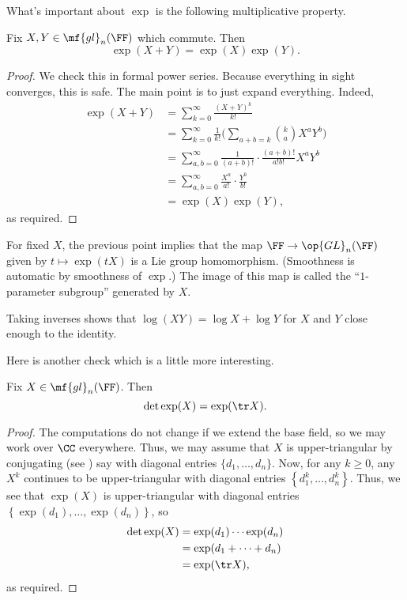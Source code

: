 \documentclass[../notes.tex]{subfiles}
\begin{document}
What's important about $\exp$ is the following multiplicative property.
\begin{lemma}
	Fix $X,Y\in\mf{gl}_n(\FF)$ which commute. Then
	\[\exp(X+Y)=\exp(X)\exp(Y).\]
\end{lemma}
\begin{proof}
	We check this in formal power series. Because everything in sight converges, this is safe. The main point is to just expand everything. Indeed,
	\begin{align*}
		\exp(X+Y) &= \sum_{k=0}^\infty\frac{(X+Y)^k}{k!} \\
		&= \sum_{k=0}^\infty\frac1{k!}\Bigg(\sum_{a+b=k}\binom kaX^aY^b\Bigg) \\
		&= \sum_{a,b=0}^\infty\frac1{(a+b)!}\cdot\frac{(a+b)!}{a!b!}X^aY^b \\
		&= \sum_{a,b=0}^\infty\frac{X^a}{a!}\cdot\frac{Y^b}{b!} \\
		&= \exp(X)\exp(Y),
	\end{align*}
	as required.
\end{proof}
\begin{remark}
	For fixed $X$, the previous point implies that the map $\FF\to\op{GL}_n(\FF)$ given by $t\mapsto\exp(tX)$ is a Lie group homomorphism. (Smoothness is automatic by smoothness of $\exp$.) The image of this map is called the ``$1$-parameter subgroup'' generated by $X$.
\end{remark}
\begin{remark}
	Taking inverses shows that $\log(XY)=\log X+\log Y$ for $X$ and $Y$ close enough to the identity.
\end{remark}
Here is another check which is a little more interesting.
\begin{lemma} \label{lem:det-exp-exp-tr}
	Fix $X\in\mf{gl}_n(\FF)$. Then
	\[\det\exp(X)=\exp(\tr X).\]
\end{lemma}
\begin{proof}
	The computations do not change if we extend the base field, so we may work over $\CC$ everywhere. Thus, we may assume that $X$ is upper-triangular by conjugating (see ) say with diagonal entries $\{d_1,\ldots,d_n\}$. Now, for any $k\ge0$, any $X^k$ continues to be upper-triangular with diagonal entries $\left\{d_1^k,\ldots,d_n^k\right\}$. Thus, we see that $\exp(X)$ is upper-triangular with diagonal entries $\left\{\exp(d_1),\ldots,\exp(d_n)\right\}$, so
	\begin{align}
		\det\exp(X) &= \exp(d_1)\cdots\exp(d_n) \\
		&= \exp(d_1+\cdots+d_n) \\
		&= \exp(\tr X),
	\end{align}
	as required.
\end{proof}
\end{document}
